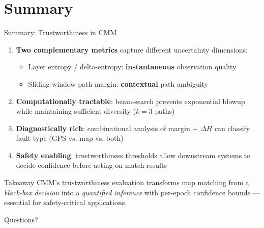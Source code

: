 \documentclass[10pt,aspectratio=169]{beamer}
\begin{document}
\section{Summary}

\begin{frame}{Summary: Trustworthiness in CMM}
  \begin{enumerate}
    \item \textbf{Two complementary metrics} capture different uncertainty dimensions:
    \begin{itemize}
      \item Layer entropy / delta-entropy: \textbf{instantaneous} observation quality
      \item Sliding-window path margin: \textbf{contextual} path ambiguity
    \end{itemize}

    \item \textbf{Computationally tractable}: beam-search prevents exponential blowup
    while maintaining sufficient diversity ($k=3$ paths)

    \item \textbf{Diagnostically rich}: combinational analysis of margin + $\Delta H$
    can classify fault type (GPS vs. map vs. both)

    \item \textbf{Safety enabling}: trustworthiness thresholds allow downstream
    systems to decide confidence before acting on match results
  \end{enumerate}

  \vspace{0.4cm}
  \begin{alertblock}{Takeaway}
    CMM's trustworthiness evaluation transforms map matching from a
    \emph{black-box decision} into a \emph{quantified inference} with
    per-epoch confidence bounds — essential for safety-critical
    applications.
  \end{alertblock}
\end{frame}


\begin{frame}[standout]
  \huge Questions?
\end{frame}
\end{document}
